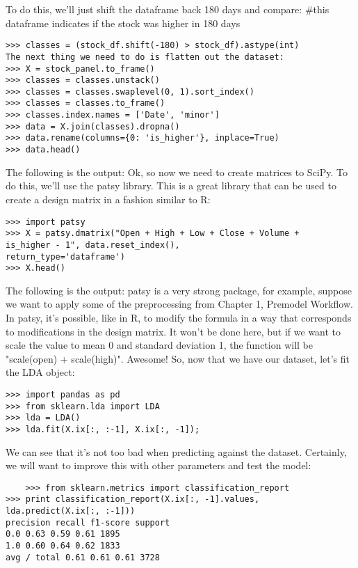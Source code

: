 To do this, we'll just shift the dataframe back 180 days and compare:
#this dataframe indicates if the stock was higher in 180 days
\begin{framed}
\begin{verbatim}
>>> classes = (stock_df.shift(-180) > stock_df).astype(int)
The next thing we need to do is flatten out the dataset:
>>> X = stock_panel.to_frame()
>>> classes = classes.unstack()
>>> classes = classes.swaplevel(0, 1).sort_index()
>>> classes = classes.to_frame()
>>> classes.index.names = ['Date', 'minor']
>>> data = X.join(classes).dropna()
>>> data.rename(columns={0: 'is_higher'}, inplace=True)
>>> data.head()
\end{verbatim}
\end{framed}
The following is the output:
Ok, so now we need to create matrices to SciPy. To do this, we'll use the patsy library. This is
a great library that can be used to create a design matrix in a fashion similar to R:
\begin{framed}
\begin{verbatim}
>>> import patsy
>>> X = patsy.dmatrix("Open + High + Low + Close + Volume +
is_higher - 1", data.reset_index(),
return_type='dataframe')
>>> X.head()
\end{verbatim}
\end{framed}
The following is the output:
patsy is a very strong package, for example, suppose we want to apply some of the
preprocessing from Chapter 1, Premodel Workflow. In patsy, it's possible, like in R,
to modify the formula in a way that corresponds to modifications in the design matrix.
It won't be done here, but if we want to scale the value to mean 0 and standard
deviation 1, the function will be "scale(open) + scale(high)".
Awesome! So, now that we have our dataset, let's fit the LDA object:
\begin{framed}
	\begin{verbatim}
>>> import pandas as pd
>>> from sklearn.lda import LDA
>>> lda = LDA()
>>> lda.fit(X.ix[:, :-1], X.ix[:, -1]);
\end{verbatim}
\end{framed}
We can see that it's not too bad when predicting against the dataset. Certainly, we will
want to improve this with other parameters and test the model:
\begin{framed}
	\begin{verbatim}
	>>> from sklearn.metrics import classification_report
>>> print classification_report(X.ix[:, -1].values,
lda.predict(X.ix[:, :-1]))
precision recall f1-score support
0.0 0.63 0.59 0.61 1895
1.0 0.60 0.64 0.62 1833
avg / total 0.61 0.61 0.61 3728
\end{verbatim}
\end{framed}
